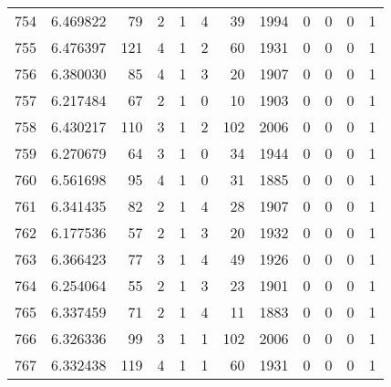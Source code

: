 \begin{tabular}{lrrrrrrrrrrr}
754 &  6.469822 &   79 &      2 &        1 &      4 &              39 &  1994 &               0 &               0 &               0 &               1 \\
755 &  6.476397 &  121 &      4 &        1 &      2 &              60 &  1931 &               0 &               0 &               0 &               1 \\
756 &  6.380030 &   85 &      4 &        1 &      3 &              20 &  1907 &               0 &               0 &               0 &               1 \\
757 &  6.217484 &   67 &      2 &        1 &      0 &              10 &  1903 &               0 &               0 &               0 &               1 \\
758 &  6.430217 &  110 &      3 &        1 &      2 &             102 &  2006 &               0 &               0 &               0 &               1 \\
759 &  6.270679 &   64 &      3 &        1 &      0 &              34 &  1944 &               0 &               0 &               0 &               1 \\
760 &  6.561698 &   95 &      4 &        1 &      0 &              31 &  1885 &               0 &               0 &               0 &               1 \\
761 &  6.341435 &   82 &      2 &        1 &      4 &              28 &  1907 &               0 &               0 &               0 &               1 \\
762 &  6.177536 &   57 &      2 &        1 &      3 &              20 &  1932 &               0 &               0 &               0 &               1 \\
763 &  6.366423 &   77 &      3 &        1 &      4 &              49 &  1926 &               0 &               0 &               0 &               1 \\
764 &  6.254064 &   55 &      2 &        1 &      3 &              23 &  1901 &               0 &               0 &               0 &               1 \\
765 &  6.337459 &   71 &      2 &        1 &      4 &              11 &  1883 &               0 &               0 &               0 &               1 \\
766 &  6.326336 &   99 &      3 &        1 &      1 &             102 &  2006 &               0 &               0 &               0 &               1 \\
767 &  6.332438 &  119 &      4 &        1 &      1 &              60 &  1931 &               0 &               0 &               0 &               1 \\

\end{tabular}
